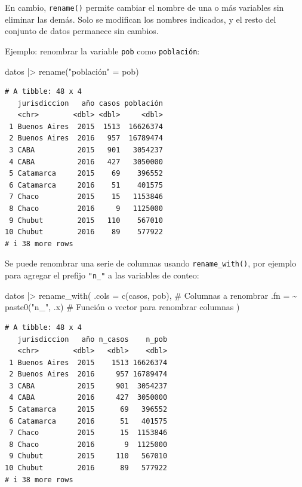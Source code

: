 \documentclass[
  spanish,
  a4paper,
]{scrbook}
\newenvironment{Shaded}{\begin{snugshade}}{\end{snugshade}}
\newcommand{\AttributeTok}[1]{\textcolor[rgb]{0.40,0.45,0.13}{#1}}
\newcommand{\CommentTok}[1]{\textcolor[rgb]{0.37,0.37,0.37}{#1}}
\newcommand{\FunctionTok}[1]{\textcolor[rgb]{0.28,0.35,0.67}{#1}}
\newcommand{\NormalTok}[1]{\textcolor[rgb]{0.00,0.23,0.31}{#1}}
\newcommand{\OtherTok}[1]{\textcolor[rgb]{0.00,0.23,0.31}{#1}}
\newcommand{\SpecialCharTok}[1]{\textcolor[rgb]{0.37,0.37,0.37}{#1}}
\newcommand{\StringTok}[1]{\textcolor[rgb]{0.13,0.47,0.30}{#1}}
\begin{document}
En cambio, \texttt{rename()} permite cambiar el nombre de una o más
variables sin eliminar las demás. Solo se modifican los nombres
indicados, y el resto del conjunto de datos permanece sin cambios.

Ejemplo: renombrar la variable \texttt{pob} como \texttt{población}:

\begin{Shaded}
\begin{Highlighting}[]
\NormalTok{datos }\SpecialCharTok{|\textgreater{}}
  \FunctionTok{rename}\NormalTok{(}\StringTok{"población"} \OtherTok{=}\NormalTok{ pob)}
\end{Highlighting}
\end{Shaded}

\begin{verbatim}
# A tibble: 48 x 4
   jurisdiccion   año casos población
   <chr>        <dbl> <dbl>     <dbl>
 1 Buenos Aires  2015  1513  16626374
 2 Buenos Aires  2016   957  16789474
 3 CABA          2015   901   3054237
 4 CABA          2016   427   3050000
 5 Catamarca     2015    69    396552
 6 Catamarca     2016    51    401575
 7 Chaco         2015    15   1153846
 8 Chaco         2016     9   1125000
 9 Chubut        2015   110    567010
10 Chubut        2016    89    577922
# i 38 more rows
\end{verbatim}

Se puede renombrar una serie de columnas usando \texttt{rename\_with()},
por ejemplo para agregar el prefijo \texttt{"n\_"} a las variables de
conteo:

\begin{Shaded}
\begin{Highlighting}[]
\NormalTok{datos }\SpecialCharTok{|\textgreater{}}
  \FunctionTok{rename\_with}\NormalTok{(}
    \AttributeTok{.cols =} \FunctionTok{c}\NormalTok{(casos, pob), }\CommentTok{\# Columnas a renombrar}
    \AttributeTok{.fn =} \SpecialCharTok{\textasciitilde{}} \FunctionTok{paste0}\NormalTok{(}\StringTok{"n\_"}\NormalTok{, .x) }\CommentTok{\# Función o vector para renombrar columnas}
\NormalTok{  )}
\end{Highlighting}
\end{Shaded}

\begin{verbatim}
# A tibble: 48 x 4
   jurisdiccion   año n_casos    n_pob
   <chr>        <dbl>   <dbl>    <dbl>
 1 Buenos Aires  2015    1513 16626374
 2 Buenos Aires  2016     957 16789474
 3 CABA          2015     901  3054237
 4 CABA          2016     427  3050000
 5 Catamarca     2015      69   396552
 6 Catamarca     2016      51   401575
 7 Chaco         2015      15  1153846
 8 Chaco         2016       9  1125000
 9 Chubut        2015     110   567010
10 Chubut        2016      89   577922
# i 38 more rows
\end{verbatim}
\end{document}
